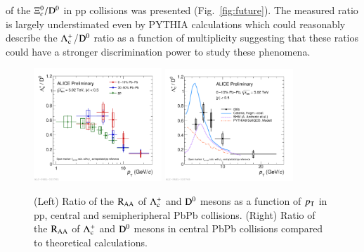 \documentclass[3p,times,procedia]{elsarticle}
\newcommand{\pt}{p_{\rm T}}
\newcommand{\Dzero}{{\rm D^0}}
\newcommand{\Lc}{{\rm \Lambda_{c}^+}}
\newcommand{\RAA}{\rm R_{AA}}
\begin{document}
of the $\Xi^{0}_{c}/\Dzero$ in pp collisions was presented (Fig.~\ref{fig:future}). The measured ratio is largely understimated even by PYTHIA calculations which could 
reasonably describe the $\Lc$/$\Dzero$ ratio as a function of multiplicity suggesting that these ratios could have a stronger discrimination power to study
these phenomena.  
\begin{figure}[h]
\includegraphics[width=0.43\textwidth]{Plots/PbPbLc/2019-10-28-LcD_PbPb18_010_3050_pp_Logx_shift.pdf}
\includegraphics[width=0.43\textwidth]{Plots/PbPbLc/2019-10-31-LcD_PbPb18_010_theory_withPythia.pdf}
\caption{
	(Left) Ratio of the $\RAA$ of $\Lc$ and $\Dzero$ mesons as a function of $\pt$ in pp, central and semipheripheral PbPb collisions. 
	(Right) Ratio of the $\RAA$ of $\Lc$ and $\Dzero$ mesons in central PbPb collisions compared to theoretical calculations.}
\label{fig:LcD0andtheory}
\end{figure}
\end{document}
